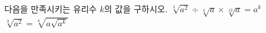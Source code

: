 다음을 만족시키는 유리수 $k$의 값을 구하시오. 
 $\sqrt[3]{a^{2}}\div\sqrt[4]{a}\times\sqrt[12]{a}=a^{k}$
 $\sqrt[3]{a^{2}}=\sqrt[4]{a\sqrt{a^{k}}}$
